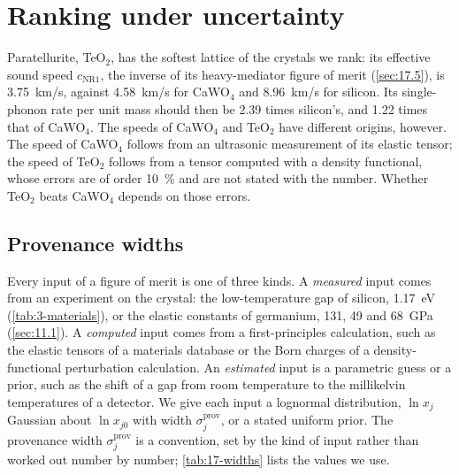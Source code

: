 \section{Ranking under uncertainty}\label{sec:17.6}

Paratellurite, TeO$_2$, has the softest lattice of the crystals we rank: its effective sound speed $c_{\mathrm{NR1}}$, the inverse of its heavy-mediator figure of merit (\cref{sec:17.5}), is \SI{3.75}{km/s}, against \SI{4.58}{km/s} for CaWO$_4$ and \SI{8.96}{km/s} for silicon. Its single-phonon rate per unit mass should then be 2.39 times silicon's, and 1.22 times that of CaWO$_4$. The speeds of CaWO$_4$ and TeO$_2$ have different origins, however. The speed of CaWO$_4$ follows from an ultrasonic measurement of its elastic tensor; the speed of TeO$_2$ follows from a tensor computed with a density functional, whose errors are of order \SI{10}{\percent} and are not stated with the number. Whether TeO$_2$ beats CaWO$_4$ depends on those errors.

\subsection{Provenance widths}\label{sec:17.6-widths}

Every input of a figure of merit is one of three kinds. A \emph{measured} input comes from an experiment on the crystal: the low-temperature gap of silicon, \SI{1.17}{eV} (\cref{tab:3-materials}), or the elastic constants of germanium, 131, 49 and \SI{68}{GPa} (\cref{sec:11.1}). A \emph{computed} input comes from a first-principles calculation, such as the elastic tensors of a materials database or the Born charges of a density-functional perturbation calculation. An \emph{estimated} input is a parametric guess or a prior, such as the shift of a gap from room temperature to the millikelvin temperatures of a detector. We give each input a lognormal distribution, $\ln x_j$ Gaussian about $\ln x_{j0}$ with width $\sigma^{\mathrm{prov}}_j$, or a stated uniform prior. The provenance width $\sigma^{\mathrm{prov}}_j$ is a convention, set by the kind of input rather than worked out number by number; \cref{tab:17-widths} lists the values we use.

